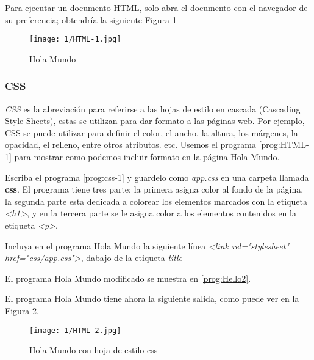 Para ejecutar un documento HTML, solo abra el documento con el navegador de su preferencia;
obtendría la siguiente Figura \ref{fig:HTML-1}

	\begin{figure} %
				\begin{center}
	\texttt{[image: 1/HTML-1.jpg]}
	\caption{Hola Mundo}
	\label{fig:HTML-1}
			\end{center}
\end{figure}

\subsubsection{CSS} 
\textit{CSS} es la abreviación para referirse a las hojas de estilo en cascada (Cascading Style Sheets), estas se utilizan  para dar formato a las páginas web. Por ejemplo, \gls{CSS}
se puede utilizar para definir el color, el ancho, la altura, los márgenes, la opacidad, el relleno, entre otros atributos. etc.
Usemos el programa \ref{prog:HTML-1} para mostrar como podemos incluir formato en la p\'agina Hola Mundo. 

 Escriba el programa \ref{prog:css-1} y guardelo como \textit{app.css} en una carpeta  llamada \textbf{css}. El programa tiene tres parte: la primera asigna color al fondo de la página, la segunda parte esta dedicada a colorear los elementos marcados con la etiqueta \textit{<h1>}, y en la tercera parte se le asigna color a los elementos contenidos en la etiqueta \textit{<p>}.
 
      \label{prog:css-1}
    
     Incluya en el programa Hola Mundo  la siguiente línea  \textit{<link rel="stylesheet" href="css/app.css">}, dabajo de la etiqueta \textit{title}
     
     El programa Hola Mundo modificado se muestra en \ref{prog:Hello2}. 
     
     \label{prog:Hello2}
 
 El programa Hola Mundo tiene ahora la siguiente salida, como puede ver en la Figura \ref{fig:HTML-2}. 
 
 \begin{figure} %
 			\begin{center}
 	\texttt{[image: 1/HTML-2.jpg]}
 	\caption{Hola Mundo con hoja de estilo css}
 	\label{fig:HTML-2}
 			\end{center}
 \end{figure}


